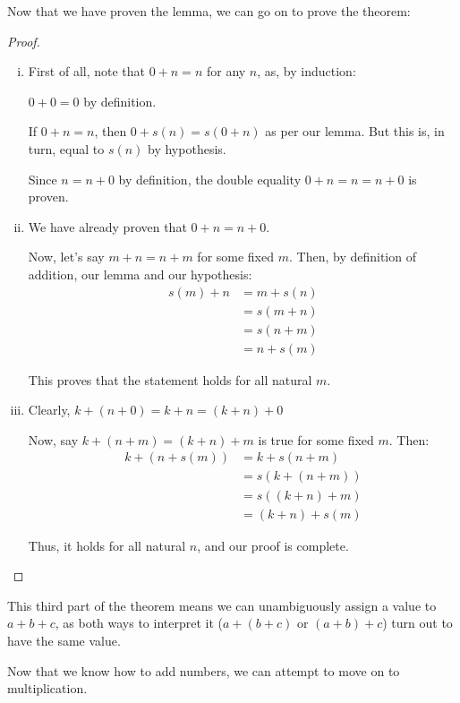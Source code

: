\documentclass[12pt,a4paper]{article}
\theoremstyle{definition}
\theoremstyle{definition}
\theoremstyle{plain}
\theoremstyle{plain}
\begin{document}
	Now that we have proven the lemma, we can go on to prove the theorem:
	
	\begin{proof}
		\begin{enumerate}[i.]
			\item First of all, note that $0 + n = n$ for any $n$, as, by induction:
			
			$0 + 0 = 0$ by definition.
			
			If $0 + n = n$, then $0 + s(n) = s(0 + n)$ as per our lemma. But this is, in turn, equal to $s(n)$ by hypothesis.
			
			Since $n = n + 0$ by definition, the double equality $0 + n = n = n + 0$ is proven.
			
			\item We have already proven that $0 + n = n + 0$.
			
			Now, let's say $m + n = n + m$ for some fixed $m$. Then, by definition of addition, our lemma and our hypothesis:
			\begin{align*}
			s(m) + n &= m + s(n) \\
					 &= s(m + n) \\
			         &= s(n + m) \\
			         &= n + s(m)
			\end{align*}
			
			This proves that the statement holds for all natural $m$.
			
			\item Clearly, $k + (n + 0) = k + n = (k + n) + 0$
			
			Now, say $k+(n+m)=(k+n)+m$ is true for some fixed $m$. Then:
			\begin{align*}
				k + (n + s(m)) &= k + s(n + m) \\
							   &= s(k + (n + m)) \\
							   &= s((k + n) + m) \\
							   &= (k + n) + s(m)
			\end{align*}
			
			Thus, it holds for all natural $n$, and our proof is complete.
			
			
		\end{enumerate}
	\end{proof}
	
	This third part of the theorem means we can unambiguously assign a value to $a + b + c$, as both ways to interpret it ($a + (b+c)$ or $(a+b) + c$) turn out to have the same value.
	
	Now that we know how to add numbers, we can attempt to move on to multiplication.
	
\end{document}
